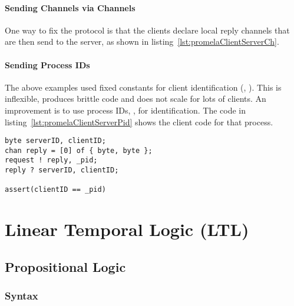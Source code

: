 			\subsubsection{Sending Channels via Channels}
				
			
				One way to fix the protocol is that the clients declare local reply channels that are then send to the server, as shown in listing~\ref{lst:promelaClientServerCh}.

			\subsubsection{Sending Process IDs}
				The above examples used fixed constants for client identification (, ). This is inflexible, produces brittle code and does not scale for lots of clients. An improvement is to use process IDs, , for identification. The code in listing~\ref{lst:promelaClientServerPid} shows the client code for that process.
			
				\begin{lstlisting}[caption = { Client-Server Model with PID in PROMELA }, label = lst:promelaClientServerPid, language = PROMELA]
byte serverID, clientID;
chan reply = [0] of { byte, byte };
request ! reply, _pid;
reply ? serverID, clientID;

assert(clientID == _pid)
				\end{lstlisting}

\chapter{Linear Temporal Logic (LTL)}
	\section{Propositional Logic}
		\subsection{Syntax}

